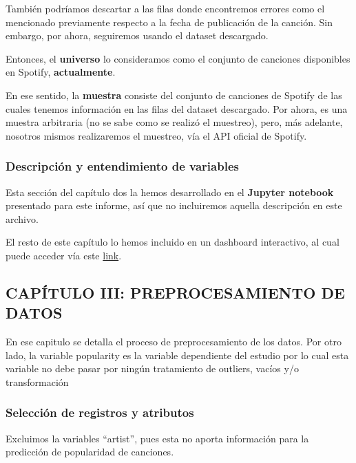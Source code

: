 \documentclass[
  letterpaper,
  DIV=11,
  numbers=noendperiod]{scrartcl}
\begin{document}
También podríamos descartar a las filas donde encontremos errores como
el mencionado previamente respecto a la fecha de publicación de la
canción. Sin embargo, por ahora, seguiremos usando el dataset
descargado.

Entonces, el \textbf{universo} lo consideramos como el conjunto de
canciones disponibles en Spotify, \textbf{actualmente}.

En ese sentido, la \textbf{muestra} consiste del conjunto de canciones
de Spotify de las cuales tenemos información en las filas del dataset
descargado. Por ahora, es una muestra arbitraria (no se sabe como se
realizó el muestreo), pero, más adelante, nosotros mismos realizaremos
el muestreo, vía el API oficial de Spotify.

\hypertarget{descripciuxf3n-y-entendimiento-de-variables}{%
\subsubsection{Descripción y entendimiento de
variables}\label{descripciuxf3n-y-entendimiento-de-variables}}

Esta sección del capítulo dos la hemos desarrollado en el
\textbf{Jupyter notebook} presentado para este informe, así que no
incluiremos aquella descripción en este archivo.

El resto de este capítulo lo hemos incluido en un dashboard interactivo,
al cual puede acceder vía este
\href{https://lucio-cornejo.shinyapps.io/chapter-II-dashboard-INF03/}{link}.

\hypertarget{capuxedtulo-iii-preprocesamiento-de-datos}{%
\subsection{CAPÍTULO III: PREPROCESAMIENTO DE
DATOS}\label{capuxedtulo-iii-preprocesamiento-de-datos}}

En ese capitulo se detalla el proceso de preprocesamiento de los datos.
Por otro lado, la variable popularity es la variable dependiente del
estudio por lo cual esta variable no debe pasar por ningún tratamiento
de outliers, vacíos y/o transformación

\hypertarget{selecciuxf3n-de-registros-y-atributos}{%
\subsubsection{Selección de registros y
atributos}\label{selecciuxf3n-de-registros-y-atributos}}

Excluimos la variables ``artist'', pues esta no aporta información para
la predicción de popularidad de canciones.
\end{document}
